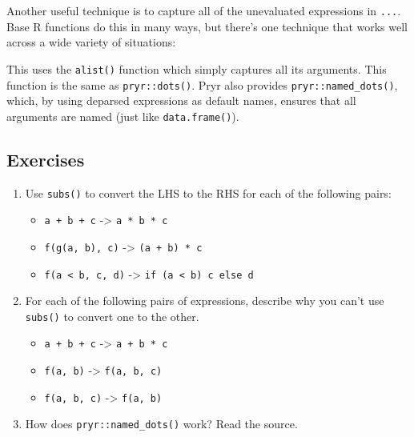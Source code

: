 Another useful technique is to capture all of the unevaluated
expressions in \texttt{...}. Base R functions do this in many ways, but
there's one technique that works well across a wide variety of
situations: 

\begin{Shaded}
\begin{Highlighting}[]
\StringTok{ }
  \NormalTok{(}\NormalTok{(}
\NormalTok{\}}
\end{Highlighting}
\end{Shaded}

This uses the \texttt{alist()} function which simply captures all its
arguments. This function is the same as \texttt{pryr::dots()}. Pryr also
provides \texttt{pryr::named\_dots()}, which, by using deparsed
expressions as default names, ensures that all arguments are named (just
like \texttt{data.frame()}). 

\hypertarget{exercises-4}{%
\subsection{Exercises}\label{exercises-4}}

\begin{enumerate}
\def\labelenumi{\arabic{enumi}.}
\tightlist
\item
  Use \texttt{subs()} to convert the LHS to the RHS for each of the
  following pairs:

  \begin{itemize}
  \tightlist
  \item
    \texttt{a\ +\ b\ +\ c} -\textgreater{} \texttt{a\ *\ b\ *\ c}
  \item
    \texttt{f(g(a,\ b),\ c)} -\textgreater{} \texttt{(a\ +\ b)\ *\ c}
  \item
    \texttt{f(a\ \textless{}\ b,\ c,\ d)} -\textgreater{}
    \texttt{if\ (a\ \textless{}\ b)\ c\ else\ d}
  \end{itemize}
\item
  For each of the following pairs of expressions, describe why you can't
  use \texttt{subs()} to convert one to the other.

  \begin{itemize}
  \tightlist
  \item
    \texttt{a\ +\ b\ +\ c} -\textgreater{} \texttt{a\ +\ b\ *\ c}
  \item
    \texttt{f(a,\ b)} -\textgreater{} \texttt{f(a,\ b,\ c)}
  \item
    \texttt{f(a,\ b,\ c)} -\textgreater{} \texttt{f(a,\ b)}
  \end{itemize}
\item
  How does \texttt{pryr::named\_dots()} work? Read the source.
\end{enumerate}


